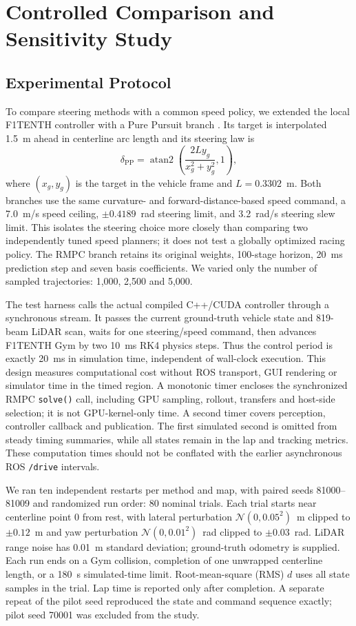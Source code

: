 \section{Controlled Comparison and Sensitivity Study}
\subsection{Experimental Protocol}
To compare steering methods with a common speed policy, we extended the local F1TENTH controller with a Pure Pursuit branch \cite{coulter1992pursuit}. Its target is interpolated 1.5~m ahead in centerline arc length and its steering law is
\begin{equation}
\delta_{\mathrm{PP}}=\operatorname{atan2}\!\left(\frac{2L y_g}{x_g^2+y_g^2},1\right),
\end{equation}
where $(x_g,y_g)$ is the target in the vehicle frame and $L=0.3302$~m. Both branches use the same curvature- and forward-distance-based speed command, a 7.0~m/s speed ceiling, $\pm0.4189$~rad steering limit, and 3.2~rad/s steering slew limit. This isolates the steering choice more closely than comparing two independently tuned speed planners; it does not test a globally optimized racing policy. The RMPC branch retains its original weights, 100-stage horizon, 20~ms prediction step and seven basis coefficients. We varied only the number of sampled trajectories: 1,000, 2,500 and 5,000.

The test harness calls the actual compiled C++/CUDA controller through a synchronous stream. It passes the current ground-truth vehicle state and 819-beam LiDAR scan, waits for one steering/speed command, then advances F1TENTH Gym by two 10~ms RK4 physics steps. Thus the control period is exactly 20~ms in simulation time, independent of wall-clock execution. This design measures computational cost without ROS transport, GUI rendering or simulator time in the timed region. A monotonic timer encloses the synchronized RMPC \texttt{solve()} call, including GPU sampling, rollout, transfers and host-side selection; it is not GPU-kernel-only time. A second timer covers perception, controller callback and publication. The first simulated second is omitted from steady timing summaries, while all states remain in the lap and tracking metrics. These computation times should not be conflated with the earlier asynchronous ROS \texttt{/drive} intervals.

We ran ten independent restarts per method and map, with paired seeds 81000--81009 and randomized run order: 80 nominal trials. Each trial starts near centerline point 0 from rest, with lateral perturbation $\mathcal N(0,0.05^2)$~m clipped to $\pm0.12$~m and yaw perturbation $\mathcal N(0,0.01^2)$~rad clipped to $\pm0.03$~rad. LiDAR range noise has 0.01~m standard deviation; ground-truth odometry is supplied. Each run ends on a Gym collision, completion of one unwrapped centerline length, or a 180~s simulated-time limit. Root-mean-square (RMS) $d$ uses all state samples in the trial. Lap time is reported only after completion. A separate repeat of the pilot seed reproduced the state and command sequence exactly; pilot seed 70001 was excluded from the study.

